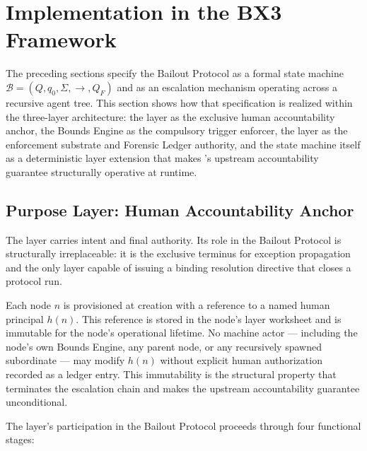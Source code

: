 \section{Implementation in the BX3 Framework}
\label{sec:implementation}

The preceding sections specify the Bailout Protocol as a formal state machine $\mathcal{B} = (Q, q_0, \Sigma, \rightarrow, Q_F)$ and as an escalation mechanism operating across a recursive agent tree. This section shows how that specification is realized within the \bxthree{} three-layer architecture: the \purpose{} layer as the exclusive human accountability anchor, the Bounds Engine as the compulsory trigger enforcer, the \fact{} layer as the enforcement substrate and Forensic Ledger authority, and the state machine itself as a deterministic \fact{} layer extension that makes \bxthree{}'s upstream accountability guarantee structurally operative at runtime.

\subsection{Purpose Layer: Human Accountability Anchor}
\label{sec:purpose-layer}

The \purpose{} layer carries intent and final authority. Its role in the Bailout Protocol is structurally irreplaceable: it is the exclusive terminus for exception propagation and the only layer capable of issuing a binding resolution directive that closes a protocol run.

Each \bxthree{} node $n$ is provisioned at creation with a reference to a named human principal $h(n)$. This reference is stored in the node's \purpose{} layer worksheet and is immutable for the node's operational lifetime. No machine actor — including the node's own Bounds Engine, any parent node, or any recursively spawned subordinate — may modify $h(n)$ without explicit human authorization recorded as a ledger entry. This immutability is the structural property that terminates the escalation chain and makes the upstream accountability guarantee unconditional.

The \purpose{} layer's participation in the Bailout Protocol proceeds through four functional stages:

